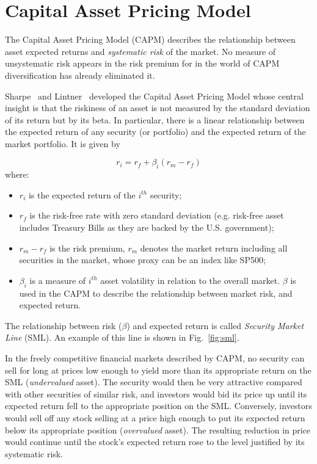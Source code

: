 \section{Capital Asset Pricing Model}
\label{sec:capm}

The Capital Asset Pricing Model (CAPM) describes the relationship between asset expected returns and \emph{systematic risk} of the market. No measure of unsystematic risk appears in the risk premium for in the world of CAPM diversification has already eliminated it.

Sharpe~\cite{bib:capm_sharpe} and Lintner~\cite{bib:capm_lintner} developed the Capital Asset Pricing Model whose central insight is that the riskiness of an asset is not measured by the standard deviation of its return but by its beta. In particular, there is a linear relationship between the expected return of any security (or portfolio) and the expected return of the market portfolio. It is given by

\begin{equation}
r_i = r_f + \beta_i(r_m-r_f)
\label{eq:capm}
\end{equation}
where:
\begin{itemize}
\item $r_i$ is the expected return of the $i^{th}$ security;
\item $r_f$ is the risk-free rate with zero standard deviation (e.g. risk-free asset includes Treasury Bills as they are backed by the U.S. government);
\item $r_m - r_f$ is the risk premium, $r_m$ denotes the market return including all securities in the market, whose proxy can be an index like SP500;
\item $\beta_i$ is a measure of $i^{th}$ asset volatility in relation to the overall market. $\beta$ is used in the CAPM to describe the relationship between market risk, and expected return.
\end{itemize}

The relationship between risk ($\beta$) and expected return is called \emph{Security Market Line} (SML). An example of this line is shown in Fig.~\ref{fig:sml}.

In the freely competitive financial markets described by CAPM, no security can sell for long at prices low enough to yield more than its appropriate return on the SML (\emph{undervalued} asset). The security would then be very attractive compared with other securities of similar risk, and investors would bid its price up until its expected return fell to the appropriate position on the SML. Conversely, investors would sell off any stock selling at a price high enough to put its expected return below its appropriate position (\emph{overvalued} asset). The resulting reduction in price would continue until the stock’s expected return rose to the level justified by its systematic risk.


